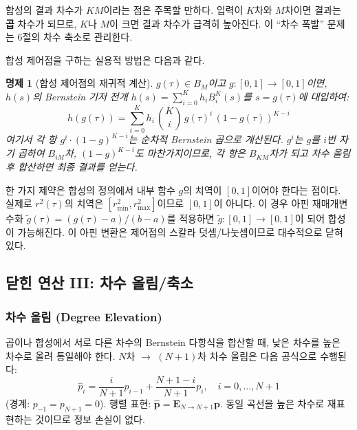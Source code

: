 \documentclass[11pt]{article}
\newtheorem{proposition}{명제}
\begin{document}
합성의 결과 차수가 $KM$이라는 점은 주목할 만하다.
입력이 $K$차와 $M$차이면 결과는 \textbf{곱} 차수가 되므로,
$K$나 $M$이 크면 결과 차수가 급격히 높아진다.
이 ``차수 폭발'' 문제는 6절의 차수 축소로 관리한다.

합성 제어점을 구하는 실용적 방법은 다음과 같다.

\begin{proposition}[합성 제어점의 재귀적 계산]
\label{prop:composition-recursive}
$g(\tau) \in B_M$이고 $g:[0,1]\to[0,1]$이면,
$h(s)$의 Bernstein 기저 전개 $h(s) = \sum_{i=0}^K h_i B_i^K(s)$를
$s = g(\tau)$에 대입하여:
\begin{equation}
  h(g(\tau)) = \sum_{i=0}^K h_i \, \binom{K}{i} \, g(\tau)^i \, (1-g(\tau))^{K-i}
  \label{eq:composition-expand}
\end{equation}
여기서 각 항 $g^i \cdot (1-g)^{K-i}$는 순차적 Bernstein 곱으로 계산된다.
$g^i$는 $g$를 $i$번 자기 곱하여 $B_{iM}$차, $(1-g)^{K-i}$도 마찬가지이므로,
각 항은 $B_{KM}$차가 되고 차수 올림 후 합산하면 최종 결과를 얻는다.
\end{proposition}

한 가지 제약은 합성의 정의에서 내부 함수 $g$의 치역이 $[0,1]$이어야 한다는 점이다.
실제로 $r^2(\tau)$의 치역은 $[r_\mathrm{min}^2, r_\mathrm{max}^2]$이므로
$[0,1]$이 아니다.
이 경우 아핀 재매개변수화 $\tilde{g}(\tau) = (g(\tau) - a)/(b-a)$를 적용하면
$\tilde{g}: [0,1] \to [0,1]$이 되어 합성이 가능해진다.
이 아핀 변환은 제어점의 스칼라 덧셈/나눗셈이므로 대수적으로 닫혀 있다.

\subsection{닫힌 연산 III: 차수 올림/축소}
\label{ssec:degree}

\subsubsection{차수 올림 (Degree Elevation)}

곱이나 합성에서 서로 다른 차수의 Bernstein 다항식을 합산할 때,
낮은 차수를 높은 차수로 올려 통일해야 한다.
$N$차 $\to$ $(N+1)$차 차수 올림은 다음 공식으로 수행된다:
\begin{equation}
  \hat{p}_i = \frac{i}{N+1} p_{i-1} + \frac{N+1-i}{N+1} p_i,
  \quad i = 0, \ldots, N+1
  \label{eq:elevation}
\end{equation}
(경계: $p_{-1} = p_{N+1} = 0$).
행렬 표현: $\hat{\mathbf{p}} = \mathbf{E}_{N \to N+1} \mathbf{p}$.
동일 곡선을 높은 차수로 재표현하는 것이므로 정보 손실이 없다.
\end{document}
